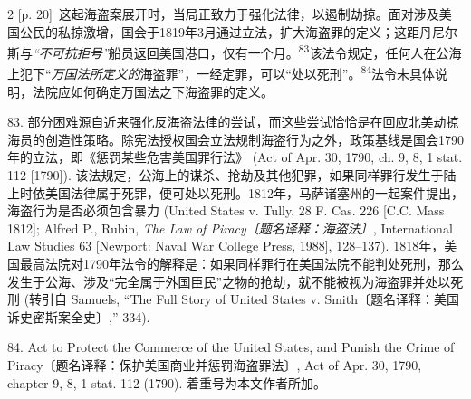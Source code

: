 \documentclass[10pt,a4paper]{article}
\begin{document}
\begin{paracol}{2}
{\scriptsize\color{gray} [p. 20]}\ 这起海盗案展开时，当局正致力于强化法律，以遏制劫掠。面对涉及美国公民的私掠激增，国会于1819年3月通过立法，扩大海盗罪的定义；这距丹尼尔斯与\textit{“不可抗拒号”}船员返回美国港口，仅有一个\mbox{月。\textsuperscript{83}}该法令规定，任何人在公海上犯下“\textit{万国法所定义的}海盗罪”，一经定罪，可以“处以死刑”。\nobreak\textsuperscript{84}法令未具体说明，法院应如何确定万国法之下海盗罪的定义。\par{\small 83. 部分困难源自近来强化反海盗法律的尝试，而这些尝试恰恰是在回应北美劫掠海员的创造性策略。除宪法授权国会立法规制海盗行为之外，政策基线是国会1790年的立法，即《惩罚某些危害美国罪行法》 (Act of Apr. 30, 1790, ch. 9, 8, 1 stat. 112 [1790]). 该法规定，公海上的谋杀、抢劫及其他犯罪，如果同样罪行发生于陆上时依美国法律属于死罪，便可处以死刑。1812年，马萨诸塞州的一起案件提出，海盗行为是否必须包含暴力 (United States v. Tully, 28 F. Cas. 226 [C.C. Mass 1812]; Alfred P., Rubin, \textit{The Law of Piracy〔题名译释：海盗法〕}, International Law Studies 63 [Newport: Naval War College Press, 1988], 128–137). 1818年，美国最高法院对1790年法令的解释是：如果同样罪行在美国法院不能判处死刑，那么发生于公海、涉及“完全属于外国臣民”之物的抢劫，就不能被视为海盗罪并处以死刑 (转引自 Samuels, “The Full Story of United States v. Smith〔题名译释：美国诉史密斯案全史〕,” 334).\par}{\small 84. Act to Protect the Commerce of the United States, and Punish the Crime of Piracy〔题名译释：保护美国商业并惩罚海盗罪法〕, Act of Apr. 30, 1790, chapter 9, 8, 1 stat. 112 (1790). 着重号为本文作者所加。\par}
\switchcolumn

\end{paracol}
\end{document}
